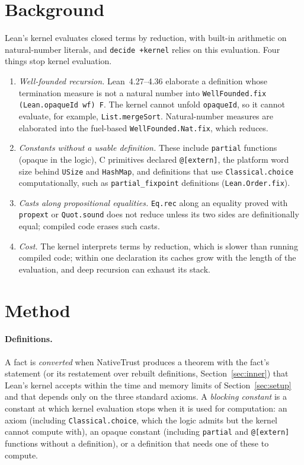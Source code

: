 \documentclass[11pt]{article}
\begin{document}
\section{Background}\label{sec:background}

Lean's kernel evaluates closed terms by reduction, with built-in arithmetic on natural-number
literals, and \texttt{decide +kernel} relies on this evaluation. Four things stop kernel evaluation.
\begin{enumerate}
\item \emph{Well-founded recursion.} Lean~4.27--4.36 elaborate a definition whose termination
  measure is not a natural number into \verb|WellFounded.fix (Lean.opaqueId wf) F|. The kernel
  cannot unfold \texttt{opaqueId}, so it cannot evaluate, for example, \texttt{List.mergeSort}.
  Natural-number measures are elaborated into the fuel-based \texttt{WellFounded.Nat.fix}, which reduces.
\item \emph{Constants without a usable definition.} These include \texttt{partial} functions
  (opaque in the logic), C primitives declared \verb|@[extern]|, the platform word size behind
  \texttt{USize} and \texttt{HashMap}, and definitions that use \texttt{Classical.choice}
  computationally, such as \texttt{partial\_fixpoint} definitions (\texttt{Lean.Order.fix}).
\item \emph{Casts along propositional equalities.} \texttt{Eq.rec} along an equality proved with
  \texttt{propext} or \texttt{Quot.sound} does not reduce unless its two sides are definitionally
  equal; compiled code erases such casts.
\item \emph{Cost.} The kernel interprets terms by reduction, which is slower than running compiled
  code; within one declaration its caches grow with the length of the evaluation, and deep
  recursion can exhaust its stack.
\end{enumerate}

\section{Method}\label{sec:method}

\paragraph{Definitions.} A fact is \emph{converted} when NativeTrust produces a theorem with the
fact's statement (or its restatement over rebuilt definitions, Section~\ref{sec:inner}) that Lean's
kernel accepts within the time and memory limits of Section~\ref{sec:setup} and that depends only on the three
standard axioms. A \emph{blocking constant} is a constant at which kernel evaluation stops when it
is used for computation: an axiom (including \texttt{Classical.choice}, which the logic admits but
the kernel cannot compute with), an opaque constant (including \texttt{partial} and
\verb|@[extern]| functions without a definition), or a definition that needs one of these to
compute.
\end{document}
